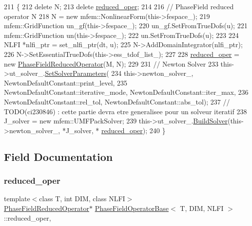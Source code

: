 \begin{DoxyCode}
211                                                                                        \{
212   \textcolor{keyword}{delete} N;
213   \textcolor{keyword}{delete} \hyperlink{classPhaseFieldOperatorBase_a010a3da035afe945635288cc0ab2f0b5}{reduced\_oper};
214 
216   \textcolor{comment}{// PhaseField reduced operator N}
218 \textcolor{comment}{}  N = \textcolor{keyword}{new} mfem::NonlinearForm(this->fespace\_);
219   mfem::GridFunction un\_gf(this->fespace\_);
220   un\_gf.SetFromTrueDofs(u);
221   mfem::GridFunction un(this->fespace\_);
222   un.SetFromTrueDofs(u);
223 
224   NLFI *nlfi\_ptr = set\_nlfi\_ptr(dt, u);
225   N->AddDomainIntegrator(nlfi\_ptr);
226   N->SetEssentialTrueDofs(this->ess\_tdof\_list\_);
227 
228   \hyperlink{classPhaseFieldOperatorBase_a010a3da035afe945635288cc0ab2f0b5}{reduced\_oper} = \textcolor{keyword}{new} \hyperlink{classPhaseFieldReducedOperator}{PhaseFieldReducedOperator}(M, N);
229 
231   \textcolor{comment}{// Newton Solver}
233 \textcolor{comment}{}  this->ut\_solver\_.\hyperlink{classUtilsForSolvers_a5e352c96817ea210dcf3e080c13d4b1d}{SetSolverParameters}(
234       this->newton\_solver\_, NewtonDefaultConstant::print\_level,
235       NewtonDefaultConstant::iterative\_mode, NewtonDefaultConstant::iter\_max,
236       NewtonDefaultConstant::rel\_tol, NewtonDefaultConstant::abs\_tol);
237   \textcolor{comment}{// TODO(ci230846) : cette partie devra etre generalisee pour un solveur iteratif}
238   J\_solver = \textcolor{keyword}{new} mfem::UMFPackSolver;
239   this->ut\_solver\_.\hyperlink{classUtilsForSolvers_a5c76f7ef4f28a5e22f6d07666134aa4d}{BuildSolver}(this->newton\_solver\_, *J\_solver, *
      \hyperlink{classPhaseFieldOperatorBase_a010a3da035afe945635288cc0ab2f0b5}{reduced\_oper});
240 \}
\end{DoxyCode}


\subsection{Field Documentation}
\mbox{\label{classPhaseFieldOperatorBase_a010a3da035afe945635288cc0ab2f0b5}} 
\subsubsection{\texorpdfstring{reduced\+\_\+oper}{reduced\_oper}}
{\footnotesize\ttfamily template$<$class T, int D\+IM, class N\+L\+FI$>$ \\
\hyperlink{classPhaseFieldReducedOperator}{Phase\+Field\+Reduced\+Operator}$\ast$ \hyperlink{classPhaseFieldOperatorBase}{Phase\+Field\+Operator\+Base}$<$ T, D\+IM, N\+L\+FI $>$\+::reduced\+\_\+oper\hspace{0.3cm}{\ttfamily [protected]}, {\ttfamily [inherited]}}

